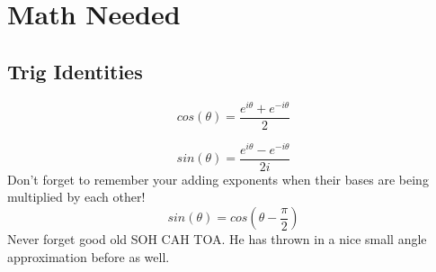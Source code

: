 \documentclass{article}
\begin{document}

















\section{Math Needed}
\subsection{Trig Identities}
\begin{equation}
    cos(\theta)= \frac{e^{i \theta}+e^{-i \theta}}{2}
\end{equation}

\begin{equation}
    sin(\theta)= \frac{e^{i \theta}-e^{-i \theta}}{2i}
\end{equation}
Don't forget to remember your adding exponents when their bases are being multiplied by each other!
\begin{equation}
    sin(\theta)= cos(\theta - \frac{\pi}{2}) 
\end{equation}
Never forget good old SOH CAH TOA. 
He has thrown in a nice small angle approximation before as well. 
\end{document}

